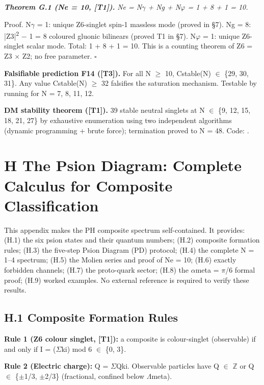 \documentclass[11pt,letterpaper]{article}
\begin{document}
\noindent \textbf{\textit{Theorem G.1 (Ne = 10, [T1]). }}\textit{Ne = N$\gamma$ + Ng + N$\varphi$ = 1 + 8 + 1 = 10.}

\noindent Proof. N$\gamma$ = 1: unique Z6-singlet spin-1 massless mode (proved in §7). Ng = 8: |Z3|\textsuperscript{2} $-$ 1 = 8 coloured gluonic bilinears (proved T1 in §7). N$\varphi$ = 1: unique Z6-singlet scalar mode. Total: 1 + 8 + 1 = 10. This is a counting theorem of Z6 = Z3 $\times$ Z2; no free parameter. $\square$

\noindent \textbf{Falsifiable prediction F14 ([T3]). }For all N $\ge$ 10, Cstable(N) $\in$ \{29, 30, 31\}. Any value Cstable(N) $\ge$ 32 falsifies the saturation mechanism. Testable by running  for N = 7, 8, 11, 12.

\noindent \textbf{DM stability theorem ([T1]). }39 stable neutral singlets at N $\in$ \{9, 12, 15, 18, 21, 27\} by exhaustive enumeration using two independent algorithms (dynamic programming + brute force); termination proved to N = 48. Code: .

\section*{H  The Psion Diagram: Complete Calculus for Composite Classification}

\noindent This appendix makes the PH composite spectrum self-contained. It provides: (H.1) the six psion states and their quantum numbers; (H.2) composite formation rules; (H.3) the five-step Psion Diagram (PD) protocol; (H.4) the complete N = 1--4 spectrum; (H.5) the Molien series and proof of Ne = 10; (H.6) exactly forbidden channels; (H.7) the proto-quark sector; (H.8) the $\alpha$meta = $\pi$/6 formal proof; (H.9) worked examples. No external reference is required to verify these results.

\subsection*{H.1  Composite Formation Rules}

\noindent \textbf{Rule 1 (Z6 colour singlet, [T1]): }a composite is colour-singlet (observable) if and only if I = ($\Sigma$ki) mod 6 $\in$ \{0, 3\}.

\noindent \textbf{Rule 2 (Electric charge): }Q = $\Sigma$Qki. Observable particles have Q $\in$ $\mathbb{Z}$ or Q $\in$ \{$\pm$1/3, $\pm$2/3\} (fractional, confined below $\Lambda$meta).
\end{document}
